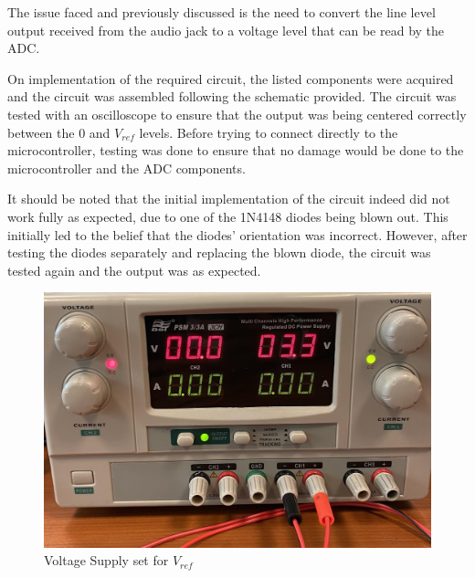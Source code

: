 \documentclass{cce2014-design}
\begin{document}
The issue faced and previously discussed is the need to convert the line level output received from the audio jack to a voltage level that can be read by the ADC.

On implementation of the required circuit, the listed components were acquired and the circuit was assembled following the schematic provided.
The circuit was tested with an oscilloscope to ensure that the output was being centered correctly between the $0$ and $V_{ref}$ levels.
Before trying to connect directly to the microcontroller, testing was done to ensure that no damage would be done to the microcontroller and the ADC components.

It should be noted that the initial implementation of the circuit indeed did not work fully as expected, due to one of the 1N4148 diodes being blown out.
This initially led to the belief that the diodes' orientation was incorrect.
However, after testing the diodes separately and replacing the blown diode, the circuit was tested again and the output was as expected.

\begin{figure}[!h]
   \centering
   \includegraphics[width=0.8\linewidth]{vref.jpg}
   \caption{Voltage Supply set for $V_{ref}$}
   \label{fig:vrefvoltageexample}
\end{figure}

\vspace{1em}
\end{document}
